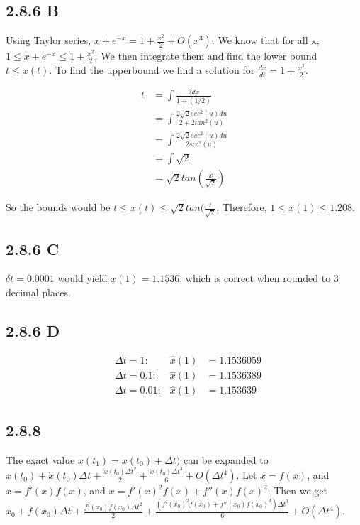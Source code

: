 \documentclass[]{article}
\begin{document}
	\subsection*{2.8.6 B}
	Using Taylor series, $x + e^{-x} = 1 + \frac{x^2}{2} + O(x^3)$. We know that for all x, $1 \leq x + e^{-x} \leq 1 + \frac{x^2}{2}$. We then integrate them and find the lower bound $t \leq x(t)$. To find the upperbound we find a solution for $\frac{dx}{dt} = 1 + \frac{x^2}{2}$.
	
	\begin{align*}
	t &= \int \frac{2dx}{1 + (1/2)}\\
	&= \int \frac{2\sqrt{2}sec^2(u) du}{2 + 2tan^2(u)}\\
	&= \int \frac{2\sqrt{2}sec^2(u) du}{2sec^2(u)}\\
	&= \int \sqrt{2}\\
	&= \sqrt{2} tan(\frac{x}{\sqrt{2}})
	\end{align*}
	
	So the bounds would be $t \leq x(t) \leq \sqrt{2} tan(\frac{t}{\sqrt{2}}$. Therefore, $1 \leq x(1) \leq 1.208$.
	
	\subsection*{2.8.6 C} $\delta t = 0.0001$ would yield $x(1) = 1.1536$, which is correct when rounded to 3 decimal places.
	\subsection*{2.8.6 D}
	
	\begin{align*}
	&\Delta t = 1: & \hat x (1) &=  1.1536059\\
	&\Delta t = 0.1: & \hat x (1) &= 1.1536389\\
	&\Delta t = 0.01: & \hat x (1) &= 1.153639
	\end{align*}
	
	
	\subsection*{2.8.8} The exact value $x(t_1) = x(t_0) + \Delta t)$ can be expanded to $x (t_0) + \dot x(t_0) \Delta t + \frac{\ddot x(t_0) \Delta t^2}{2} + \frac{\dddot x(t_0) \Delta t^3}{6} + O(\Delta t^4)$. Let $\dot x = f(x)$, and $\ddot x = f'(x) f(x)$, and $\dddot x = f'(x)^2 f(x) + f''(x)f(x)^2$. Then we get $x_0 + f(x_0)\Delta t + \frac{f'(x_0) f(x_0) \Delta t^2}{2} + \frac{(f'(x_0)^2 f(x_0) + f''(x_0)f(x_0)^2) \Delta t^3}{6} + O(\Delta t^4)$.\\
	
\end{document}
